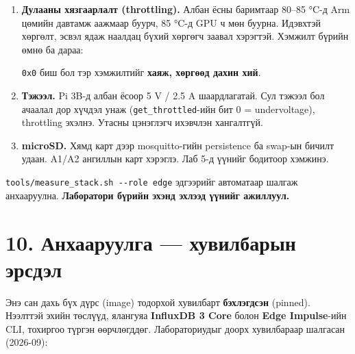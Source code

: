 \begin{enumerate}
\def\labelenumi{\arabic{enumi}.}
\item
  \textbf{Дулааны хязгаарлалт (throttling).} Албан ёсны баримтаар 80--85 °C-д Arm цөмийн давтамж аажмаар буурч, 85 °C-д GPU ч мөн буурна. Идэвхтэй хөргөлт, эсвэл ядаж наалдац бүхий хөргөгч заавал хэрэгтэй. Хэмжилт бүрийн өмнө ба дараа:

\begin{Shaded}
\begin{Highlighting}[]
\end{Highlighting}
\end{Shaded}

  \texttt{0x0} биш бол тэр хэмжилтийг \textbf{хаяж, хөргөөд дахин хий}.
\item
  \textbf{Тэжээл.} Pi 3B-д албан ёсоор 5 V / 2.5 A шаардлагатай. Сул тэжээл бол ачаалал дор хүчдэл унаж (\texttt{get\_throttled}-ийн бит 0 = undervoltage), throttling эхэлнэ. Утасны цэнэглэгч ихэвчлэн хангалтгүй.
\item
  \textbf{microSD.} Хямд карт дээр mosquitto-гийн persistence ба swap-ын бичилт удаан. A1/A2 ангиллын карт хэрэглэ. Лаб 5-д үүнийг бодитоор хэмжинэ.
\end{enumerate}

\texttt{tools/\allowbreak{}measure\_\allowbreak{}stack.\allowbreak{}sh\ -\/\allowbreak{}-role\ edge} эдгээрийг автоматаар шалгаж анхааруулна. \textbf{Лаборатори бүрийн эхэнд эхлээд үүнийг ажиллуул.}

\hypertarget{ux430ux43dux445ux430ux430ux440ux443ux443ux43bux433ux430-ux445ux443ux432ux438ux43bux431ux430ux440ux44bux43d-ux44dux440ux441ux434ux44dux43b}{%
\section{10. Анхааруулга --- хувилбарын эрсдэл}\label{ux430ux43dux445ux430ux430ux440ux443ux443ux43bux433ux430-ux445ux443ux432ux438ux43bux431ux430ux440ux44bux43d-ux44dux440ux441ux434ux44dux43b}}

Энэ сан дахь бүх дүрс (image) тодорхой хувилбарт \textbf{бэхлэгдсэн} (pinned). Нээлттэй эхийн төслүүд, ялангуяа \textbf{InfluxDB 3 Core} болон \textbf{Edge Impulse}-ийн CLI, тохиргоо түргэн өөрчлөгддөг. Лабораториудыг доорх хувилбараар шалгасан (2026-09):

